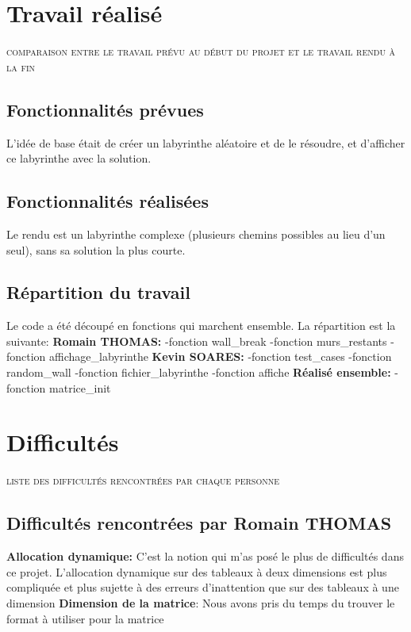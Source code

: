 \documentclass{article}
\begin{document}
\section{Travail réalisé}
\textsc{comparaison entre le travail prévu au début du projet et le travail rendu à la fin}
\subsection{Fonctionnalités prévues}
L'idée de base était de créer un labyrinthe aléatoire et de le résoudre, et d'afficher ce labyrinthe avec la solution.
\subsection{Fonctionnalités réalisées}
Le rendu est un labyrinthe complexe (plusieurs chemins possibles au lieu d'un seul), sans sa solution la plus courte.
\subsection{Répartition du travail}
Le code a été découpé en fonctions qui marchent ensemble. La répartition est la suivante:\newline\newline
\textbf{Romain THOMAS:}\newline
-fonction wall\_break\newline
-fonction murs\_restants\newline
-fonction affichage\_labyrinthe\newline
\newline\newline
\textbf{Kevin SOARES:}\newline
-fonction test\_cases\newline
-fonction random\_wall\newline
-fonction fichier\_labyrinthe\newline
-fonction affiche\newline\newline
\textbf{Réalisé ensemble:}\newline
-fonction matrice\_init




\section{Difficultés}
\textsc{liste des difficultés rencontrées par chaque personne}
\subsection{Difficultés rencontrées par Romain THOMAS}
\textbf{Allocation dynamique:}
C'est la notion qui m'as posé le plus de difficultés dans ce projet. L'allocation dynamique sur des tableaux à deux dimensions est plus compliquée et plus sujette à des erreurs d'inattention que sur des tableaux à une dimension\newline
\textbf{Dimension de la matrice}: Nous avons pris du temps du trouver le format à utiliser pour la matrice\newline
\end{document}
